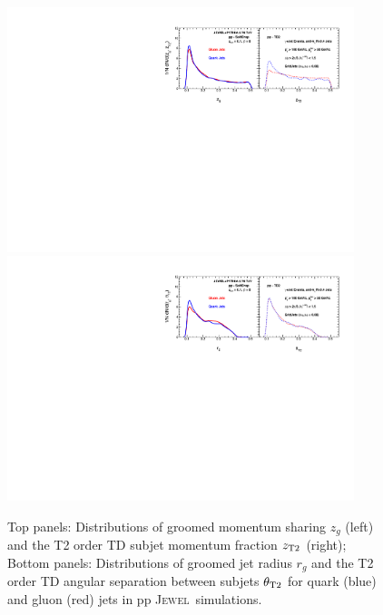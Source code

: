 \documentclass[notoc,preprintnumbers]{JHEP3}
\newcommand{\jw}{\textsc{Jewel}~}
\begin{document}
\begin{figure}[t]
	   \centering
	   \includegraphics[width=0.9\textwidth]{Fig5a}
	   \includegraphics[width=0.9\textwidth]{Fig5b}
	   \caption{Top panels: Distributions of groomed momentum sharing $z_g$ (left) and the T2 order TD subjet momentum fraction $z_{\rm T2}$ (right); Bottom panels: Distributions of groomed jet radius $r_g$ and the T2 order TD angular separation between subjets $\theta_{\rm T2}$ for quark (blue) and gluon (red) jets in pp \jw simulations.}
\label{fig:comp_z_pp_wT2}
\end{figure}
\end{document}
